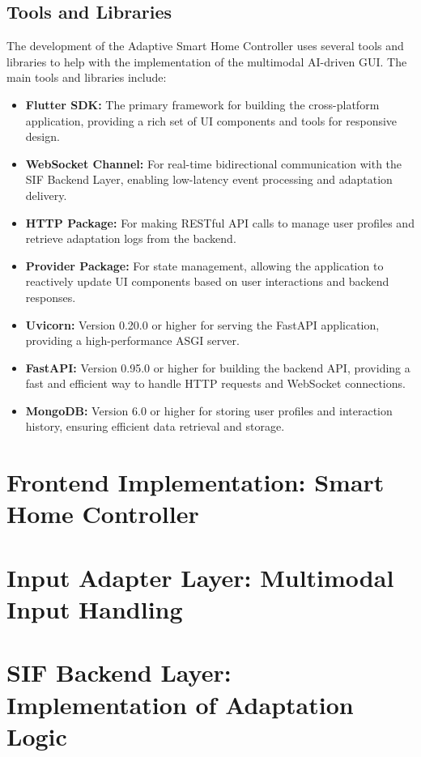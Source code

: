 \documentclass[openany]{book}
\begin{document}
\subsection{Tools and Libraries}
The development of the Adaptive Smart Home Controller uses several tools and libraries to help with the implementation of the multimodal AI-driven GUI. 
The main tools and libraries include:
\begin{itemize}
    \item \textbf{Flutter SDK:} The primary framework for building the cross-platform application, providing a rich set of UI components and tools for responsive design.
    \item \textbf{WebSocket Channel:} For real-time bidirectional communication with the SIF Backend Layer, enabling low-latency event processing and adaptation delivery.
    \item \textbf{HTTP Package:} For making RESTful API calls to manage user profiles and retrieve adaptation logs from the backend.
    \item \textbf{Provider Package:} For state management, allowing the application to reactively update UI components based on user interactions and backend responses.
    \item \textbf{Uvicorn:} Version 0.20.0 or higher for serving the FastAPI application, providing a high-performance ASGI server.
    \item \textbf{FastAPI:} Version 0.95.0 or higher for building the backend API, providing a fast and efficient way to handle HTTP requests and WebSocket connections.
    \item \textbf{MongoDB:} Version 6.0 or higher for storing user profiles and interaction history, ensuring efficient data retrieval and storage.
\end{itemize}

\section{Frontend Implementation: Smart Home Controller}

\section{Input Adapter Layer: Multimodal Input Handling}

\section{SIF Backend Layer: Implementation of Adaptation Logic}
\end{document}
